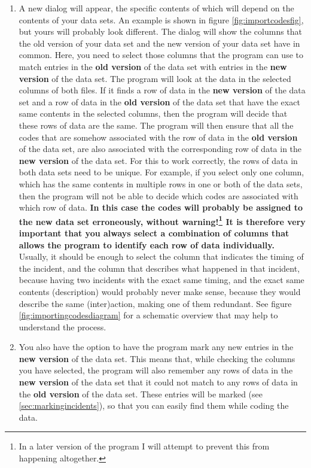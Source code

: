 \documentclass{memoir}
\begin{document}
\begin{enumerate}
\item{A new dialog will appear, the specific contents of which will depend on the contents of your data sets. An example is shown in figure \ref{fig:importcodesfig}, but yours will probably look different. The dialog will show the columns that the old version of your data set and the new version of your data set have in common. Here, you need to select those columns that the program can use to match entries in the \textbf{old version} of the data set with entries in the \textbf{new version} of the data set. The program will look at the data in the selected columns of both files. If it finds a row of data in the \textbf{new version} of the data set and a row of data in the \textbf{old version} of the data set that have the exact same contents in the selected columns, then the program will decide that these rows of data are the same. The program will then ensure that all the codes that are somehow associated with the row of data in the \textbf{old version} of the data set, are also associated with the corresponding row of data in the \textbf{new version} of the data set. For this to work correctly, the rows of data in both data sets need to be unique. For example, if you select only one column, which has the same contents in multiple rows in one or both of the data sets, then the program will not be able to decide which codes are associated with which row of data. \textbf{In this case the codes will probably be assigned to the new data set erroneously, without warning!\footnote{In a later version of the program I will attempt to prevent this from happening altogether.} It is therefore very important that you always select a combination of columns that allows the program to identify each row of data individually.} Usually, it should be enough to select the column that indicates the timing of the incident, and the column that describes what happened in that incident, because having two incidents with the exact same timing, and the exact same contents (description) would probably never make sense, because they would describe the same (inter)action, making one of them redundant. See figure \ref{fig:importingcodesdiagram} for a schematic overview that may help to understand the process.}
\item{You also have the option to have the program mark any new entries in the \textbf{new version} of the data set. This means that, while checking the columns you have selected, the program will also remember any rows of data in the \textbf{new version} of the data set that it could not match to any rows of data in the \textbf{old version} of the data set. These entries will be marked (see \ref{sec:markingincidents}), so that you can easily find them while coding the data.}

\end{enumerate}
\end{document}
